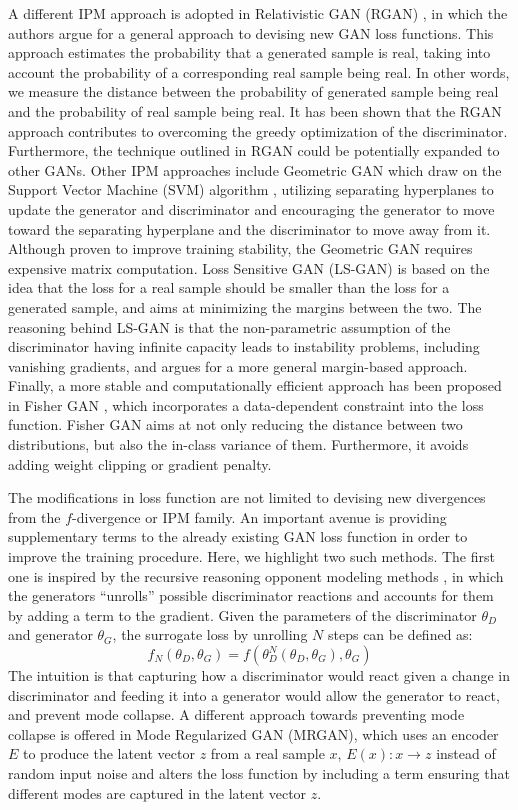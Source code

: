 A different IPM approach is adopted in Relativistic GAN (RGAN) , in which the authors argue for a general approach to devising new GAN loss functions. This approach estimates the probability that a generated sample is real, taking into account the probability of a corresponding real sample being real. In other words, we measure the distance between the probability of generated sample being real and the probability of real sample being real. It has been shown that the RGAN approach contributes to overcoming the greedy optimization of the discriminator. Furthermore, the technique outlined in RGAN could be potentially expanded to other GANs.
Other IPM approaches include Geometric GAN  which draw on the Support Vector Machine (SVM) algorithm , utilizing separating hyperplanes to update the generator and discriminator and encouraging the generator to move toward the separating hyperplane and the discriminator to move away from it. Although proven to improve training stability, the Geometric GAN requires expensive  matrix computation. Loss Sensitive GAN (LS-GAN)  is based on the idea that the loss for a real sample should be smaller than the loss for a generated sample, and aims at minimizing the margins between the two. The reasoning behind LS-GAN is that the non-parametric assumption of the discriminator having infinite capacity  leads to instability problems, including vanishing gradients, and argues for a more general margin-based approach. Finally, a more stable and computationally efficient approach has been proposed in Fisher GAN , which incorporates a data-dependent constraint into the loss function. Fisher GAN aims at not only reducing the distance between two distributions, but also the in-class variance of them. Furthermore, it avoids adding weight clipping or gradient penalty.

The modifications in loss function are not limited to devising new divergences from the $f$-divergence or IPM family. An important avenue is providing supplementary terms to the already existing GAN loss function in order to improve the training procedure. Here, we highlight two such methods. The first one is inspired by the recursive reasoning opponent modeling methods , in which the generators ``unrolls'' possible discriminator reactions and accounts for them by adding a term to the gradient. Given the parameters of the discriminator $\theta_{D}$ and generator $\theta_{G}$, the surrogate loss by unrolling $N$ steps can be defined as:
\begin{equation}
f_{N}(\theta_{D}, \theta_{G}) =  f(\theta_{D}^{N}(\theta_{D}, \theta_{G}), \theta_{G})
\end{equation}
The intuition is that capturing how a discriminator would react given a change in discriminator and feeding it into a generator would allow the generator to react, and prevent mode collapse. A different approach towards preventing mode collapse is offered in Mode Regularized GAN (MRGAN), which uses an encoder $E$ to produce the latent vector $z$ from a real sample $x$, $E(x):x \rightarrow z$ instead of random input noise and alters the loss function by including a term ensuring that different modes are captured in the latent vector $z$.

